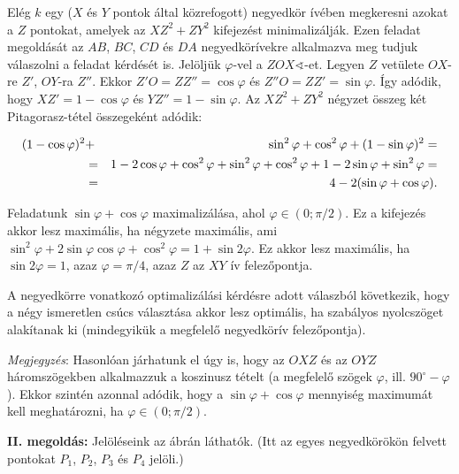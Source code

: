 \documentclass[a4paper,10pt]{article}
\begin{document}
Elég $k$ egy ($X$ és $Y$ pontok által közrefogott) negyedkör ívében megkeresni azokat a $Z$
pontokat, amelyek az $XZ^2+ZY^2$ kifejezést minimalizálják. Ezen feladat megoldását az $AB$, $BC$,
$CD$ és $DA$ negyedkörívekre alkalmazva meg tudjuk válaszolni a feladat kérdését is.
Jelöljük $\varphi$-vel a $ZOX\sphericalangle$-et. Legyen $Z$ vetülete $OX$-re 
$Z'$, $OY$-ra $Z''$. Ekkor
$Z'O = ZZ'' = \cos \varphi$  és $Z''O = ZZ' = \sin \varphi$. Így adódik, 
hogy $XZ' = 1 - \cos \varphi$  és
$YZ'' = 1 -\sin \varphi$. Az $XZ^2+ZY^2$ négyzet összeg két Pitagorasz-tétel összegeként adódik:

\begin{eqnarray*}
(1 - \cos \varphi)^2&+&\sin^2 \varphi+\cos^ 2 \varphi+(1-\sin \varphi)^2
=\cr
&=& 1 - 2 \cos \varphi  + \cos^2 \varphi  + \sin^2 \varphi  
+ \cos^2 \varphi  + 1 - 2 \sin \varphi  + \sin^2 \varphi  =\cr
&=& 4 - 2(\sin \varphi+\cos \varphi).
\end{eqnarray*}

Feladatunk $\sin \varphi +\cos \varphi$  maximalizálása, ahol 
$\varphi \in (0; \pi/2)$.
Ez a kifejezés akkor lesz
maximális, ha négyzete maximális, ami $\sin^2 \varphi+2 \sin \varphi  \cos \varphi  + \cos^ 2 \varphi  = 1 + \sin 2 \varphi$. Ez akkor
lesz maximális, ha $\sin 2\varphi  = 1$, azaz $\varphi  = \pi/4$, azaz $Z$ az $XY$ ív felezőpontja.

A negyedkörre vonatkozó optimalizálási kérdésre adott válaszból következik, hogy a
négy ismeretlen csúcs választása akkor lesz optimális, ha szabályos nyolcszöget alakítanak ki
(mindegyikük a megfelelő negyedkörív felezőpontja).


\textit{Megjegyzés}: Hasonlóan járhatunk el úgy is, hogy az $OXZ$ és az $OYZ$ háromszögekben
alkalmazzuk a koszinusz tételt (a megfelelő szögek $\varphi$, ill. 
$90^\circ - \varphi$). Ekkor szintén azonnal
adódik, hogy a $\sin \varphi + \cos \varphi$  mennyiség maximumát kell meghatározni, ha $\varphi  \in (0; \pi/2)$.

\medskip

\newpage
{\bf II. megoldás:} Jelöléseink az ábrán láthatók. (Itt az egyes negyedkörökön felvett pontokat $P_1$, $P_2$, $P_3$ és $P_4$ jelöli.)
\end{document}
